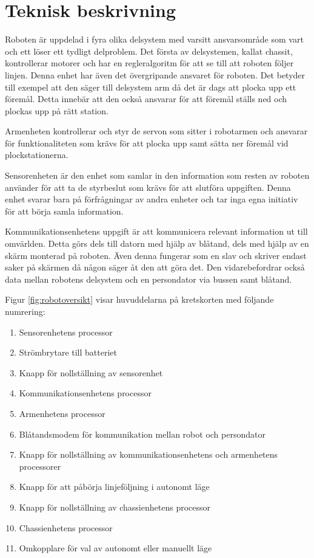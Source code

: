 
\section{Teknisk beskrivning}

Roboten är uppdelad i fyra olika delsystem med varsitt ansvarsområde som vart och ett löser ett tydligt delproblem. Det första av delsystemen, kallat chassit, kontrollerar motorer och har en regleralgoritm för att se till att roboten följer linjen. Denna enhet har även det övergripande ansvaret för roboten. Det betyder till exempel att den säger till delsystem arm då det är dags att plocka upp ett föremål. Detta innebär att den också ansvarar för att föremål ställs ned och plockas upp på rätt station.

Armenheten kontrollerar och styr de servon som sitter i robotarmen och ansvarar för funktionaliteten som krävs för att plocka upp samt sätta ner föremål vid plockstationerna.

Sensorenheten är den enhet som samlar in den information som resten av roboten använder för att ta de styrbeslut som krävs för att slutföra uppgiften. Denna enhet svarar bara på förfrågningar av andra enheter och tar inga egna initiativ för att börja samla information.

Kommunikationsenhetens uppgift är att kommunicera relevant information ut till omvärlden. Detta görs dels till datorn med hjälp av blåtand, dels med hjälp av en skärm monterad på roboten. Även denna fungerar som en slav och skriver endast saker på skärmen då någon säger åt den att göra det. Den vidarebefordrar också data mellan robotens delsystem och en persondator via bussen samt blåtand.



Figur \ref{fig:robotoversikt} visar huvuddelarna på kretskorten med följande numrering:
\begin{enumerate}
\item Sensorenhetens processor
\item Strömbrytare till batteriet
\item Knapp för nollställning av sensorenhet
\item Kommunikationsenhetens processor
\item Armenhetens processor
\item Blåtandsmodem för kommunikation mellan robot och persondator
\item Knapp för nollställning av kommunikationsenhetens och armenhetens processorer
\item Knapp för att påbörja linjeföljning i autonomt läge
\item Knapp för nollställning av chassienhetens processor
\item Chassienhetens processor
\item Omkopplare för val av autonomt eller manuellt läge
\end{enumerate}


